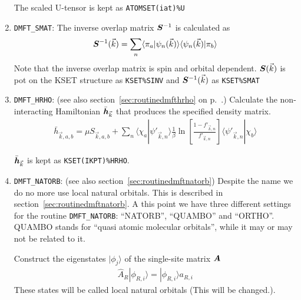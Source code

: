 \documentclass[11pt,a4paper]{report}
\begin{document}
\begin{enumerate}
The scaled U-tensor is kept as \verb|ATOMSET(iat)%U|
%
\item \verb|DMFT_SMAT|: The inverse overlap matrix $\bm{S}^{-1}$ is
  calculated as
\begin{eqnarray}
\bm{S}^{-1}(\vec{k})
=\sum_n\langle\pi_a|\psi_n(\vec{k})\rangle\langle\psi_n(\vec{k})|\pi_b\rangle
\end{eqnarray}
Note that the inverse overlap matrix is spin and orbital dependent.
$\bm{S}(\vec{k})$ is pot on the KSET structure as \verb|KSET%SINV| 
and $\bm{S}^{-1}(\vec{k})$ as \verb|KSET%SMAT| 
%
\item \verb|DMFT_HRHO|: (see also section~\ref{sec:routinedmfthrho} on
p.~\pageref{sec:routinedmfthrho}.) Calculate the non-interacting
Hamiltonian $\bar{\bm{h}}_{\vec{k}}$ that produces the specified
density matrix.
\begin{eqnarray}
\bar{h}_{\vec{k},a,b}=\mu S_{\vec{k},a,b}+\sum_{n}
\langle\chi_a|\psi'_{\vec{k},n}\rangle\frac{1}{\beta}
\ln\left[\frac{1-f'_{\vec{k},n}}{f'_{\vec{k},n}}\right]
\langle\psi'_{\vec{k},n}|\chi_b\rangle
\end{eqnarray}

$\bar{\bm{h}}_{\vec{k}}$ is kept as \verb|KSET(IKPT)%HRHO|.
%
\item \verb|DMFT_NATORB|: (see also
  section~\ref{sec:routinedmftnatorb}) Despite the name we do no more
  use local natural orbitals. This is described in
  section~\ref{sec:routinedmftnatorb}. A this point we have three
  different settings for the routine \verb|DMFT_NATORB|: ``NATORB'',
  ``QUAMBO'' and ``ORTHO''. QUAMBO stands for ``quasi atomic molecular
  orbitals''\cite{qian08_prb78_245112}, while it may or may not be
  related to it.

  Construct the eigenstates $|\phi_j\rangle$ of the single-site
   matrix $\bm{A}$
\begin{eqnarray}
\hat{A}_R|\phi_{R,i}\rangle=|\phi_{R,i}\rangle a_{R,i}
\end{eqnarray}
These states will be called local natural orbitals (This will be
changed.).


\end{enumerate}
\end{document}
